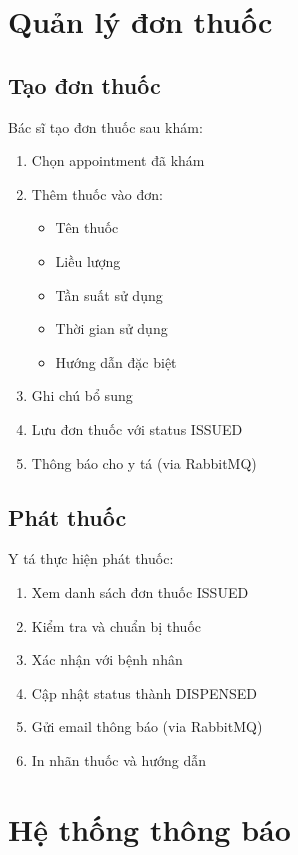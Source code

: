 \documentclass[12pt,a4paper]{report}
\begin{document}
    \section{Quản lý đơn thuốc}

    \subsection{Tạo đơn thuốc}
    Bác sĩ tạo đơn thuốc sau khám:
    \begin{enumerate}
        \item Chọn appointment đã khám
        \item Thêm thuốc vào đơn:
            \begin{itemize}
                \item Tên thuốc
                \item Liều lượng
                \item Tần suất sử dụng
                \item Thời gian sử dụng
                \item Hướng dẫn đặc biệt
            \end{itemize}
        \item Ghi chú bổ sung
        \item Lưu đơn thuốc với status ISSUED
        \item Thông báo cho y tá (via RabbitMQ)
    \end{enumerate}

    \subsection{Phát thuốc}
    Y tá thực hiện phát thuốc:
    \begin{enumerate}
        \item Xem danh sách đơn thuốc ISSUED
        \item Kiểm tra và chuẩn bị thuốc
        \item Xác nhận với bệnh nhân
        \item Cập nhật status thành DISPENSED
        \item Gửi email thông báo (via RabbitMQ)
        \item In nhãn thuốc và hướng dẫn
    \end{enumerate}

    \section{Hệ thống thông báo}
\end{document}
